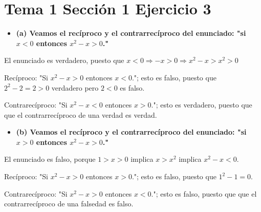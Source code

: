 \documentclass{article}
\begin{document}
\section{Tema 1 Sección 1 Ejercicio 3}
\begin{itemize}
\item \bf (a) \rm Veamos el recíproco y el contrarrecíproco del enunciado: "si $x<0$ entonces $x^2-x>0$."
\end{itemize}
El enunciado es verdadero, puesto que $x<0\Rightarrow -x>0 \Rightarrow x^2-x>x^2>0$

Recíproco: "Si $x^2-x>0$ entonces $x<0$."; esto es falso, puesto que $2^2-2=2>0$ verdadero pero $2<0$ es falso.

Contrarecíproco: "Si $x^2-x<0$ entonces $x>0$."; esto es verdadero, puesto que que el contrarrecíproco de una verdad es verdad.
\begin{itemize}
\item \bf (b) \rm Veamos el recíproco y el contrarrecíproco del enunciado: "si $x>0$ entonces $x^2-x>0$."
\end{itemize}
El enunciado es falso, porque $1>x>0$ implica $x>x^2$ implica $x^2-x<0$.

Recíproco: "Si $x^2-x>0$ entonces $x>0$."; esto es falso, puesto que $1^2-1=0$.

Contrarecíproco: "Si $x^2-x>0$ entonces $x<0$."; esto es falso, puesto que que el contrarrecíproco de una falsedad es falso.
\end{document}
